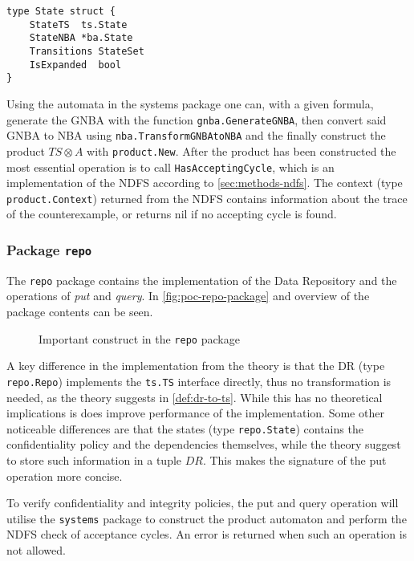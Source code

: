 \begin{lstlisting}[language=Golang, caption={Definition of \texttt{product.State}}, label={lst:product-state}, floatplacement=H]
type State struct {
    StateTS  ts.State
    StateNBA *ba.State
    Transitions StateSet
    IsExpanded  bool
}
\end{lstlisting}

Using the automata in the systems package one can, with a given formula, generate the GNBA with the function \verb=gnba.GenerateGNBA=, then convert said GNBA to NBA using \verb=nba.TransformGNBAtoNBA= and the finally construct the product $TS\otimes A$ with \verb=product.New=. After the product has been constructed the most essential operation is to call \verb=HasAcceptingCycle=, which is an implementation of the NDFS according to \autoref{sec:methods-ndfs}. The context (type \verb=product.Context=) returned from the NDFS contains information about the trace of the counterexample, or returns nil if no accepting cycle is found.

\subsubsection{Package \texttt{repo}}
The \verb=repo= package contains the implementation of the Data Repository and the operations of \emph{put} and \emph{query}. In \autoref{fig:poc-repo-package} and overview of the package contents can be seen.
\begin{figure}
    \caption{Important construct in the \texttt{repo} package}
    \label{fig:poc-repo-package}
\end{figure}
A key difference in the implementation from the theory is that the DR (type \verb=repo.Repo=) implements the \verb=ts.TS= interface directly, thus no transformation is needed, as the theory suggests in \autoref{def:dr-to-ts}. While this has no theoretical implications is does improve performance of the implementation. Some other noticeable differences are that the states (type \verb=repo.State=) contains the confidentiality policy and the dependencies themselves, while the theory suggest to store such information in a tuple $DR$. This makes the signature of the put operation more concise.

To verify confidentiality and integrity policies, the put and query operation will utilise the \verb=systems= package to construct the product automaton and perform the NDFS check of acceptance cycles. An error is returned when such an operation is not allowed.
